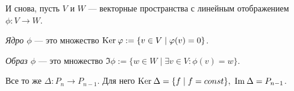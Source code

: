 И снова, пусть $V$ и $W$ --- векторные пространства с линейным отображением $\phi: V \rightarrow W$.

\begin{Def}
\textit{Ядро $\phi$} --- это множество $\mathrm{Ker}\:\varphi := \{v \in V \mid \varphi(v) = 0 \}$.
\end{Def} 
\begin{Def}
\textit{Образ $\phi$} --- это множество $\Im \phi := \{w \in W \mid \exists v \in V : \phi(v) = w \}$.
\end{Def}

\begin{Examples}
Все то же $\Delta: P_n \rightarrow P_{n-1}$. Для него $\mathrm{Ker}\: \Delta = \{f \mid f = const\},\  \mathrm{Im\:} \Delta = P_{n-1}$.
\end{Examples}
